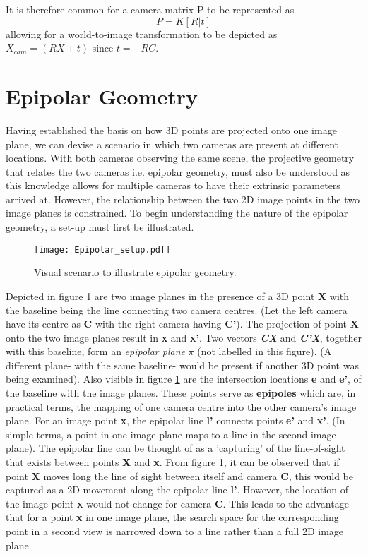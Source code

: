 \documentclass[12pt]{article}
\begin{document}
It is therefore common for a camera matrix P to be represented as 
\begin{equation}
P = K[R |t]
\end{equation}
allowing for a world-to-image transformation to be depicted as $X_{cam} = (RX + t)$ since $t= -RC$.

\section{Epipolar Geometry}
Having established the basis on how 3D points are projected onto one image plane, we can devise a scenario in which two cameras are present at different locations. With both cameras observing the same scene, the projective geometry that relates the two cameras i.e. epipolar geometry, must also be understood as this knowledge allows for multiple cameras to have their extrinsic parameters arrived at. However, the relationship between the two 2D image points in the two image planes is constrained. To begin understanding the nature of the epipolar geometry, a set-up must first be illustrated. 
\begin{figure}
\centering
\texttt{[image: Epipolar\_setup.pdf]}
\caption{Visual scenario to illustrate epipolar geometry.}\label{fig:epipolar}
\end{figure}

Depicted in figure \ref{fig:epipolar} are two image planes in the presence of a 3D point \textbf{X} with the baseline being the line connecting two camera centres. (Let the left camera have its centre as \textbf{C} with the right camera having \textbf{C'}). The projection of point \textbf{X} onto the two image planes result in \textbf{x} and \textbf{x'}. Two vectors \textbf{\textit{CX}} and \textbf{\textit{C'X}}, together with this baseline, form an \textit{epipolar plane} \textbf{$\pi$} (not labelled in this figure). (A different plane- with the same baseline- would be present if another 3D point was being examined). Also visible in figure \ref{fig:epipolar} are the intersection locations \textbf{e} and \textbf{e'}, of the baseline with the image planes. These points serve as \textbf{epipoles} which are, in practical terms, the mapping of one camera centre into the other camera's image plane. For an image point \textbf{x}, the epipolar line \textbf{l'} connects points \textbf{e'} and \textbf{x'}. (In simple terms, a point in one image plane maps to a line in the second image plane). The epipolar line can be thought of as a 'capturing' of the line-of-sight that exists between points \textbf{X} and \textbf{x}. From figure \ref{fig:epipolar}, it can be observed that if point \textbf{X} moves long the line of sight between itself and camera \textbf{C}, this would be captured as a 2D movement along the epipolar line \textbf{l'}. However, the location of the image point \textbf{x} would not change for camera \textbf{C}. This leads to the advantage that for a point \textbf{x} in one image plane, the search space for the corresponding point in a second view is narrowed down to a line rather than a full 2D image plane. 
\end{document}
